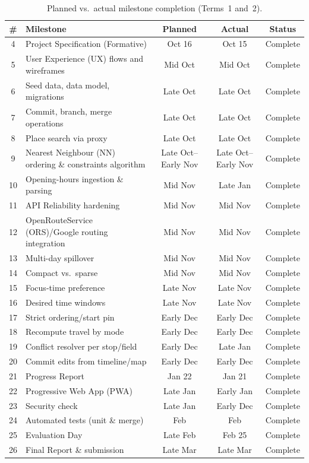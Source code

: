 \documentclass[pdftex,11pt,a4paper,oneside]{article}
\begin{document}
\begin{table}[H]
\centering
\begin{tabularx}{\textwidth}{c X c c c}
\toprule
\textbf{\#} & \textbf{Milestone} & \textbf{Planned} & \textbf{Actual} & \textbf{Status}\\
\midrule
4 & Project Specification (Formative) & Oct 16 & Oct 15 & Complete\\
5 & User Experience (UX) flows and wireframes & Mid Oct & Mid Oct & Complete\\
6 & Seed data, data model, migrations & Late Oct & Late Oct & Complete\\
7 & Commit, branch, merge operations & Late Oct & Late Oct & Complete\\
8 & Place search via proxy & Late Oct & Late Oct & Complete\\
9 & Nearest Neighbour (NN) ordering \& constraints algorithm & Late Oct--Early Nov & Late Oct--Early Nov & Complete\\
10 & Opening-hours ingestion \& parsing & Mid Nov & Late Jan & Complete\\
11 & API Reliability hardening & Mid Nov & Mid Nov & Complete\\
12 & OpenRouteService (ORS)/Google routing integration & Mid Nov & Mid Nov & Complete\\
13 & Multi-day spillover & Mid Nov & Mid Nov & Complete\\
14 & Compact vs.\ sparse & Mid Nov & Mid Nov & Complete\\
15 & Focus-time preference & Late Nov & Late Nov & Complete\\
16 & Desired time windows & Late Nov & Late Nov & Complete\\
17 & Strict ordering/start pin & Early Dec & Early Dec & Complete\\
18 & Recompute travel by mode & Early Dec & Early Dec & Complete\\
19 & Conflict resolver per stop/field & Early Dec & Late Jan & Complete\\
20 & Commit edits from timeline/map & Early Dec & Early Dec & Complete\\
21 & Progress Report & Jan 22 & Jan 21 & Complete\\
22 & Progressive Web App (PWA) & Late Jan & Early Jan & Complete\\
23 & Security check & Late Jan & Early Dec & Complete\\
24 & Automated tests (unit \& merge) & Feb & Feb & Complete\\
25 & Evaluation Day & Late Feb & Feb 25 & Complete\\
26 & Final Report \& submission & Late Mar & Late Mar & Complete\\
\bottomrule
\end{tabularx}
\caption{Planned vs.\ actual milestone completion (Terms~1 and~2).}
\label{tab:milestone-comparison}
\end{table}
\end{document}
